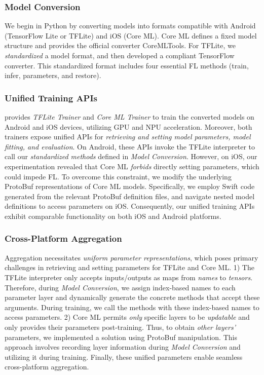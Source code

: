 \documentclass[conference]{IEEEtran}
\begin{document}
\subsubsection{Model Conversion}
We begin in Python by converting models into formats compatible with
Android (TensorFlow Lite or TFLite) and iOS (Core ML).
Core ML defines a fixed model structure and provides
the official converter CoreMLTools.
For TFLite, we \textit{standardized} a model format, and then
developed a compliant TensorFlow converter.
This standardized format includes
four essential FL methods
(\textsf{train}, \textsf{infer}, \textsf{parameters},
and \textsf{restore}).


\subsubsection{Unified Training APIs}
\FedKit{} provides \textit{TFLite Trainer} and \textit{Core ML Trainer} to
train the converted models on Android and iOS devices,
utilizing GPU and NPU acceleration.
Moreover, both trainers expose unified APIs for
\textit{retrieving and setting model parameters,
    model fitting, and evaluation}.
On Android, these APIs invoke the TFLite interpreter to call
our \textit{standardized methods} defined in \textit{Model Conversion}.
However, on iOS, our experimentation revealed that
Core ML \textit{forbids} directly setting parameters, which could impede FL.
To overcome this constraint,
we modify the underlying ProtoBuf representations of
Core ML models.
Specifically,
we employ Swift code generated from the relevant ProtoBuf definition files,
and navigate nested model definitions to access parameters on iOS.
Consequently, our unified training APIs exhibit comparable functionality on
both iOS and Android platforms.


\subsubsection{Cross-Platform Aggregation}
Aggregation necessitates
\textit{uniform parameter representations},
which poses primary challenges in
retrieving and setting parameters for TFLite and Core ML.
1)
The TFLite interpreter only accepts inputs/outputs as maps from \textit{names} to
\textit{tensors}.
Therefore, during \textit{Model Conversion},
we assign index-based names to each parameter layer and
dynamically generate the concrete methods that accept these arguments.
During training, we call the methods with these index-based names to
access parameters.
2)
Core ML permits \textit{only} specific layers to be \textit{updatable} and
only provides their parameters post-training.
Thus, to obtain \textit{other layers'} parameters,
we implemented a solution using ProtoBuf manipulation.
This approach involves recording layer information
during \textit{Model Conversion} and
utilizing it during training.
Finally, these unified parameters enable seamless cross-platform aggregation.
\end{document}
